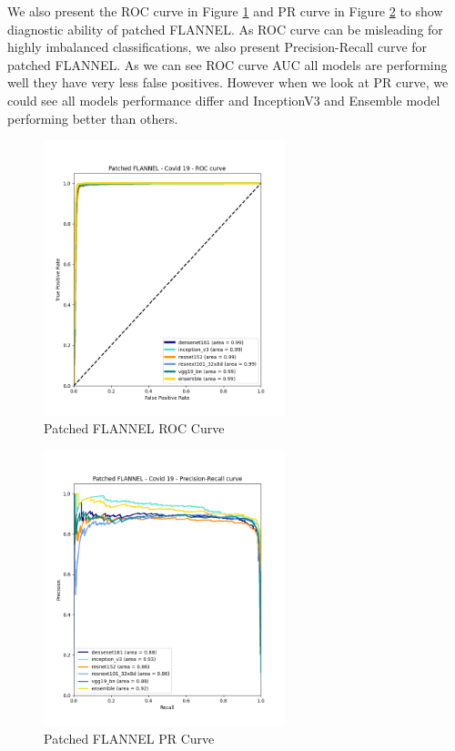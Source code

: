 \documentclass{sigkddExp}
\begin{document}
We also present the ROC curve in Figure \ref{fig:pf_roccurve} and PR curve in
Figure \ref{fig:pf_prcurve} to show diagnostic ability of patched FLANNEL.
As ROC curve can be misleading for highly imbalanced classifications, we also
present Precision-Recall curve for patched FLANNEL. As we can see ROC curve AUC 
all models are performing well they have very less false positives. However when
we look at PR curve, we could see all models performance differ and InceptionV3
and Ensemble model performing better than others.


\begin{figure}[h]
    \centering
    \includegraphics[width=7cm]{../doc/images/patched_flannel_covid_19_roc_curve.png}
    \caption{Patched FLANNEL ROC Curve}
    \label{fig:pf_roccurve}
\end{figure}

\begin{figure}[h]
    \centering
    \includegraphics[width=7cm]{../doc/images/patched_flannel_covid_19_precision_recall_curve.png}
    \caption{Patched FLANNEL PR Curve}
    \label{fig:pf_prcurve}
\end{figure}
\end{document}

